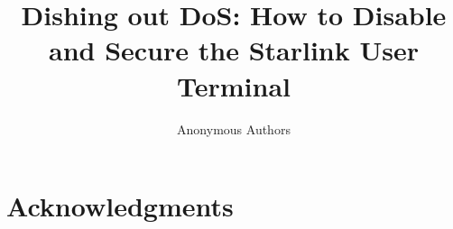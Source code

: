 \documentclass[conference]{IEEEtran}
\begin{document}
\title{Dishing out DoS: How to Disable and Secure the Starlink User Terminal}

\author{Anonymous Authors}

\begin{comment}
\author{\IEEEauthorblockN{Joshua Smailes}
\IEEEauthorblockA{University of Oxford\\
joshua.smailes@cs.ox.ac.uk}
\and
\IEEEauthorblockN{Edd Salkield}
\IEEEauthorblockA{University of Oxford\\
edd.salkield@cs.ox.ac.uk}
\and
\IEEEauthorblockN{Simon Birnbach}
\IEEEauthorblockA{University of Oxford\\
simon.birnbach@cs.ox.ac.uk}
\and
\IEEEauthorblockN{Martin Strohmeier}
\IEEEauthorblockA{Cyber-Defence Campus, armasuisse Science + Technology\\
martin.strohmeier@armasuisse.ch}
\and
\IEEEauthorblockN{Ivan Martinovic}
\IEEEauthorblockA{University of Oxford\\
ivan.martinovic@cs.ox.ac.uk}}
\end{comment}

\begin{comment}
\IEEEoverridecommandlockouts
\makeatletter\def\@IEEEpubidpullup{6.5\baselineskip}\makeatother
\IEEEpubid{\parbox{\columnwidth}{
    Network and Distributed System Security (NDSS) Symposium 2023\\
    28 February - 4 March 2023, San Diego, CA, USA\\
    ISBN 1-891562-83-5\\
    https://dx.doi.org/10.14722/ndss.2023.23xxx\\
    www.ndss-symposium.org
}
\hspace{\columnsep}\makebox[\columnwidth]{}}
\end{comment}

\maketitle










\section*{Acknowledgments}
\end{document}
